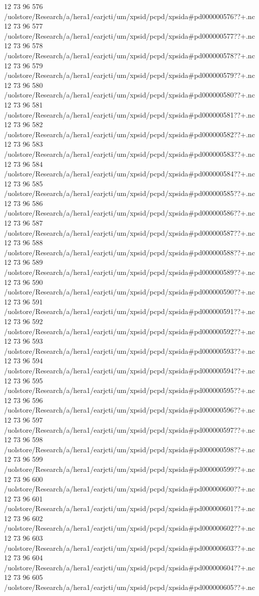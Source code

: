 12 73 96
576
/uolstore/Research/a/hera1/earjcti/um/xpsid/pcpd/xpsida#pd000000576??+.nc
12 73 96
577
/uolstore/Research/a/hera1/earjcti/um/xpsid/pcpd/xpsida#pd000000577??+.nc
12 73 96
578
/uolstore/Research/a/hera1/earjcti/um/xpsid/pcpd/xpsida#pd000000578??+.nc
12 73 96
579
/uolstore/Research/a/hera1/earjcti/um/xpsid/pcpd/xpsida#pd000000579??+.nc
12 73 96
580
/uolstore/Research/a/hera1/earjcti/um/xpsid/pcpd/xpsida#pd000000580??+.nc
12 73 96
581
/uolstore/Research/a/hera1/earjcti/um/xpsid/pcpd/xpsida#pd000000581??+.nc
12 73 96
582
/uolstore/Research/a/hera1/earjcti/um/xpsid/pcpd/xpsida#pd000000582??+.nc
12 73 96
583
/uolstore/Research/a/hera1/earjcti/um/xpsid/pcpd/xpsida#pd000000583??+.nc
12 73 96
584
/uolstore/Research/a/hera1/earjcti/um/xpsid/pcpd/xpsida#pd000000584??+.nc
12 73 96
585
/uolstore/Research/a/hera1/earjcti/um/xpsid/pcpd/xpsida#pd000000585??+.nc
12 73 96
586
/uolstore/Research/a/hera1/earjcti/um/xpsid/pcpd/xpsida#pd000000586??+.nc
12 73 96
587
/uolstore/Research/a/hera1/earjcti/um/xpsid/pcpd/xpsida#pd000000587??+.nc
12 73 96
588
/uolstore/Research/a/hera1/earjcti/um/xpsid/pcpd/xpsida#pd000000588??+.nc
12 73 96
589
/uolstore/Research/a/hera1/earjcti/um/xpsid/pcpd/xpsida#pd000000589??+.nc
12 73 96
590
/uolstore/Research/a/hera1/earjcti/um/xpsid/pcpd/xpsida#pd000000590??+.nc
12 73 96
591
/uolstore/Research/a/hera1/earjcti/um/xpsid/pcpd/xpsida#pd000000591??+.nc
12 73 96
592
/uolstore/Research/a/hera1/earjcti/um/xpsid/pcpd/xpsida#pd000000592??+.nc
12 73 96
593
/uolstore/Research/a/hera1/earjcti/um/xpsid/pcpd/xpsida#pd000000593??+.nc
12 73 96
594
/uolstore/Research/a/hera1/earjcti/um/xpsid/pcpd/xpsida#pd000000594??+.nc
12 73 96
595
/uolstore/Research/a/hera1/earjcti/um/xpsid/pcpd/xpsida#pd000000595??+.nc
12 73 96
596
/uolstore/Research/a/hera1/earjcti/um/xpsid/pcpd/xpsida#pd000000596??+.nc
12 73 96
597
/uolstore/Research/a/hera1/earjcti/um/xpsid/pcpd/xpsida#pd000000597??+.nc
12 73 96
598
/uolstore/Research/a/hera1/earjcti/um/xpsid/pcpd/xpsida#pd000000598??+.nc
12 73 96
599
/uolstore/Research/a/hera1/earjcti/um/xpsid/pcpd/xpsida#pd000000599??+.nc
12 73 96
600
/uolstore/Research/a/hera1/earjcti/um/xpsid/pcpd/xpsida#pd000000600??+.nc
12 73 96
601
/uolstore/Research/a/hera1/earjcti/um/xpsid/pcpd/xpsida#pd000000601??+.nc
12 73 96
602
/uolstore/Research/a/hera1/earjcti/um/xpsid/pcpd/xpsida#pd000000602??+.nc
12 73 96
603
/uolstore/Research/a/hera1/earjcti/um/xpsid/pcpd/xpsida#pd000000603??+.nc
12 73 96
604
/uolstore/Research/a/hera1/earjcti/um/xpsid/pcpd/xpsida#pd000000604??+.nc
12 73 96
605
/uolstore/Research/a/hera1/earjcti/um/xpsid/pcpd/xpsida#pd000000605??+.nc
